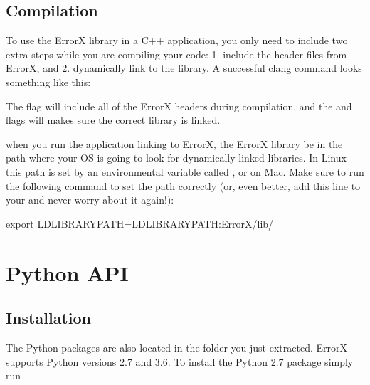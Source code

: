 \documentclass[letterpaper,10pt,english]{sphinxmanual}
\begin{document}
\section{Compilation}
\label{\detokenize{index:compilation}}
To use the ErrorX library in a C++ application, you only need to include two extra steps while you are compiling your code: 1. include the header files from ErrorX, and 2. dynamically link to the library. A successful clang command looks something like this:

\begin{sphinxVerbatim}[commandchars=\\\{\}]
     
\end{sphinxVerbatim}

The  flag will include all of the ErrorX headers during compilation, and the  and  flags will makes sure the correct library is linked.

 when you run the application linking to ErrorX, the ErrorX library  be in the path where your OS is going to look for dynamically linked libraries. In Linux this path is set by an environmental variable called , or  on Mac. Make sure to run the following command to set the path correctly (or, even better, add this line to your  and never worry about it again!):

\begin{sphinxVerbatim}[commandchars=\\\{\}]
export LD\PYGZus{}LIBRARY\PYGZus{}PATH=\PYGZdl{}LD\PYGZus{}LIBRARY\PYGZus{}PATH:ErrorX/lib/
\end{sphinxVerbatim}


\chapter{Python API}
\label{\detokenize{index:python-api}}

\section{Installation}
\label{\detokenize{index:id1}}
The Python packages are also located in the folder you just extracted. ErrorX supports Python versions 2.7 and 3.6. To install the Python 2.7 package simply run
\end{document}

